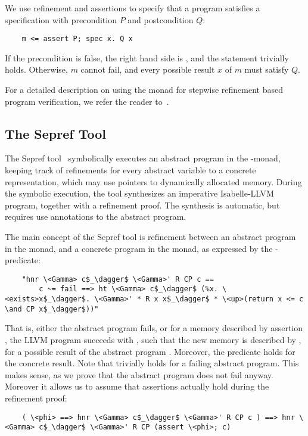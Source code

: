 \documentclass[a4paper,UKenglish,cleveref, autoref, thm-restate]{lipics-v2021}
\begin{document}
  We use refinement and assertions to
  specify that a program  satisfies a specification with precondition \is$P$ and postcondition \is$Q$:
  \begin{lstlisting}
    m <= assert P; spec x. Q x
  \end{lstlisting}
  If the precondition is false, the right hand side is , and the statement trivially holds.
  Otherwise, $m$ cannot fail, and every possible result $x$ of $m$ must satisfy $Q$.

  For a detailed description on using the  monad for stepwise refinement based program verification, we refer the reader to~\cite{LaTu12}.



  \subsection{The Sepref Tool}
  The Sepref tool~\cite{La15,La19-llvm} symbolically executes an abstract program in the -monad,
  keeping track of refinements for every abstract variable to a concrete representation, which may use pointers to dynamically allocated memory.
  During the symbolic execution, the tool synthesizes an imperative Isabelle-LLVM program, together with a refinement proof.
  The synthesis is automatic, but requires use annotations to the abstract program.

  The main concept of the Sepref tool is refinement between an abstract program  in the  monad,
  and a concrete program  in the  monad, as expressed by the -predicate:
  \begin{lstlisting}
    "hnr \<Gamma> c$_\dagger$ \<Gamma>' R CP c ==
        c ~= fail ==> ht \<Gamma> c$_\dagger$ (%x. \<exists>x$_\dagger$. \<Gamma>' * R x x$_\dagger$ * \<up>(return x <= c \and CP x$_\dagger$))"
  \end{lstlisting}
  That is, either the abstract program  fails,
  or for a memory described by assertion ,
  the LLVM program  succeeds with ,
  such that the new memory is described by ,
  for a possible result  of the abstract program . Moreover, the predicate  holds for the concrete result.
  Note that  trivially holds for a failing abstract program. This makes sense, as we prove that
  the abstract program does not fail anyway. Moreover it allows us to assume that assertions actually hold during the refinement proof:
  \begin{lstlisting}
    ( \<phi> ==> hnr \<Gamma> c$_\dagger$ \<Gamma>' R CP c ) ==> hnr \<Gamma> c$_\dagger$ \<Gamma>' R CP (assert \<phi>; c)
  \end{lstlisting}
\end{document}
